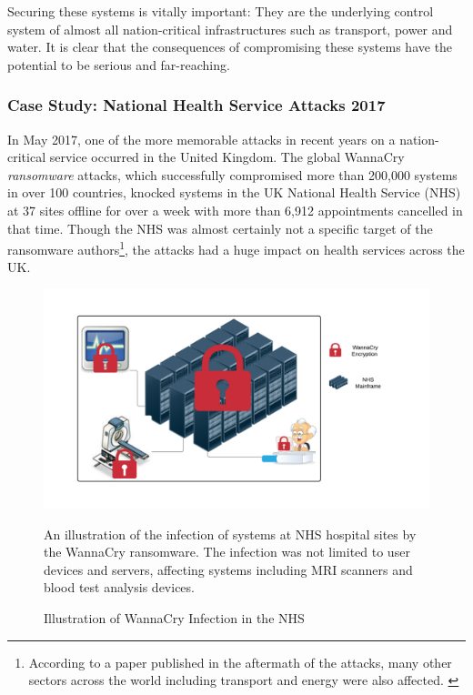  Securing these systems is vitally important: They are the underlying control system of almost all nation-critical infrastructures such as transport, power and water. It is clear that the consequences of compromising these systems have the potential to be serious and far-reaching.

\subsubsection{Case Study: National Health Service Attacks 2017} \label{WannaCryNHSCase}
In May 2017, one of the more memorable attacks in recent years on a nation-critical service occurred in the United Kingdom. The global WannaCry \textit{ransomware} attacks, which successfully compromised more than 200,000 systems in over 100 countries, knocked systems in the UK National Health Service (NHS) at 37 sites offline for over a week with more than 6,912 appointments cancelled in that time. Though the NHS was almost certainly not a specific target of the ransomware authors\footnote{According to a paper published in the aftermath of the attacks, many other sectors across the world including transport and energy were also affected. \cite{MakingSenseOfRansomwareMess}}, the attacks had a huge impact on health services across the UK. \cite{AmyasMorseWannacry}


\begin{figure}[ht]
      \centering
      \includegraphics[width=150mm, scale=1]{Images/NHS_WannaCry.png}
      \caption{Illustration of WannaCry Infection in the NHS}
      \medskip
	  \small
		An illustration of the infection of systems at NHS hospital sites by the WannaCry ransomware. The infection was not limited to user devices and servers, affecting systems including MRI scanners and blood test analysis devices. \cite{LessonsLearnedWannacryReport}
\label{fig:NHS_WannaCry_Illustration}
\end{figure}


